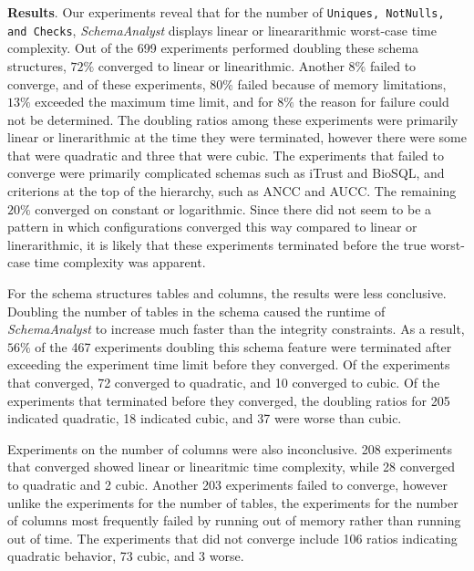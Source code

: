 
\textbf{Results}. Our experiments reveal that for the number of \texttt{Uniques, NotNulls, and Checks},
\textit{SchemaAnalyst} displays linear or lineararithmic worst-case time complexity.  Out of the 699 experiments
performed doubling these schema structures, $72\%$ converged to linear or linearithmic.  Another $8\%$ failed to
converge, and of these experiments, $80\%$ failed because of memory limitations, $13\%$ exceeded the maximum time limit,
and for $8\%$ the reason for failure could not be determined.  The doubling ratios among these experiments were
primarily linear or linerarithmic at the time they were terminated, however there were some that were quadratic and
three that were cubic.  The experiments that failed to converge were primarily complicated schemas such as iTrust and
BioSQL, and criterions at the top of the hierarchy, such as ANCC and AUCC. The remaining $20\%$ converged on constant or
logarithmic.  Since there did not seem to be a pattern in which configurations converged this way compared to linear or
linerarithmic, it is likely that these experiments terminated before the true worst-case time complexity was apparent.

For the schema structures tables and columns, the results were less conclusive. Doubling the number of tables in the
schema caused the runtime of \textit{SchemaAnalyst} to increase much faster than the integrity constraints. As a result,
$56\%$ of the 467 experiments doubling this schema feature were terminated after exceeding the experiment time limit
before they converged.  Of the experiments that converged, 72 converged to quadratic, and 10 converged to cubic.  Of the
experiments that terminated before they converged, the doubling ratios for 205 indicated quadratic, 18 indicated cubic,
and 37 were worse than cubic.

Experiments on the number of columns were also inconclusive.  208 experiments that converged showed linear or
linearitmic time complexity, while 28 converged to quadratic and 2 cubic.  Another 203 experiments failed to converge,
however unlike the experiments for the number of tables, the experiments for the number of columns most frequently
failed by running out of memory rather than running out of time. The experiments that did not converge include 106
ratios indicating quadratic behavior, 73 cubic, and 3 worse.

